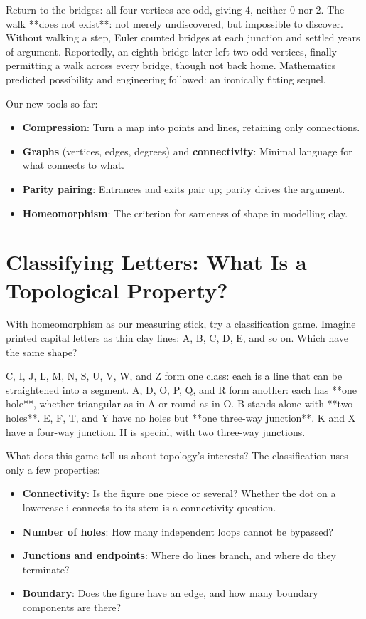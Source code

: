 Return to the bridges: all four vertices are odd, giving $4$, neither $0$ nor $2$. The walk **does not exist**: not merely undiscovered, but impossible to discover. Without walking a step, Euler counted bridges at each junction and settled years of argument. Reportedly, an eighth bridge later left two odd vertices, finally permitting a walk across every bridge, though not back home. Mathematics predicted possibility and engineering followed: an ironically fitting sequel.

\begin{toolbox}
Our new tools so far:
\begin{itemize}
  \item \textbf{Compression}: Turn a map into points and lines, retaining only connections.
  \item \textbf{Graphs} (vertices, edges, degrees) and \textbf{connectivity}: Minimal language for what connects to what.
  \item \textbf{Parity pairing}: Entrances and exits pair up; parity drives the argument.
  \item \textbf{Homeomorphism}: The criterion for sameness of shape in modelling clay.
\end{itemize}
\end{toolbox}

\section{Classifying Letters: What Is a Topological Property?}

With homeomorphism as our measuring stick, try a classification game. Imagine printed capital letters as thin clay lines: A, B, C, D, E, and so on. Which have the same shape?

C, I, J, L, M, N, S, U, V, W, and Z form one class: each is a line that can be straightened into a segment. A, D, O, P, Q, and R form another: each has **one hole**, whether triangular as in A or round as in O. B stands alone with **two holes**. E, F, T, and Y have no holes but **one three-way junction**. K and X have a four-way junction. H is special, with two three-way junctions.

What does this game tell us about topology's interests? The classification uses only a few properties:

\begin{itemize}
  \item \textbf{Connectivity}: Is the figure one piece or several? Whether the dot on a lowercase i connects to its stem is a connectivity question.
  \item \textbf{Number of holes}: How many independent loops cannot be bypassed?
  \item \textbf{Junctions and endpoints}: Where do lines branch, and where do they terminate?
  \item \textbf{Boundary}: Does the figure have an edge, and how many boundary components are there?
\end{itemize}

